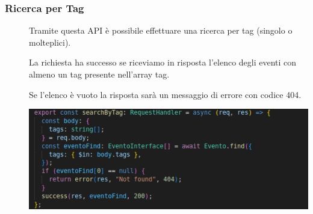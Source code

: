 \documentclass{article}
\begin{document}
\subsubsection{Ricerca per Tag}
\begin{description}
    \item[] Tramite questa API è possibile effettuare una ricerca per tag (singolo o molteplici).
    \item[] La richiesta ha successo se riceviamo in risposta l'elenco degli eventi con almeno un tag presente nell'array tag.
    \item[] Se l'elenco è vuoto la risposta sarà un messaggio di errore con codice 404.
    \item[] \begin{center}
            \includegraphics[scale=0.5]{tagEvent.png}
        \end{center}
\end{description}
\end{document}
